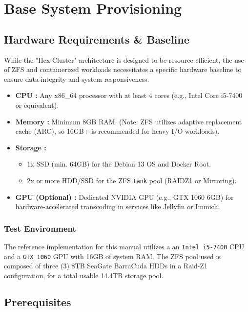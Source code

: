 \chapter{Base System Provisioning}\label{chap:base-provisioning}
\section{Hardware Requirements \& Baseline}
While the "Hex-Cluster" architecture is designed to be resource-efficient, the use of ZFS and containerized workloads necessitates a specific hardware baseline to ensure data-integrity and system responsiveness.

\begin{itemize}
	\item \textbf{CPU :} Any x86\_64 processor with at least 4 cores (e.g., Intel Core i5-7400 or equivalent).
	\item \textbf{Memory :} Minimum 8GB RAM. (Note: ZFS utilizes adaptive replacement cache (ARC), so 16GB+ is recommended for heavy I/O workloads).
	\item \textbf{Storage :} 
	\begin{itemize}
		\item 1x SSD (min. 64GB) for the Debian 13 OS and Docker Root.
		\item 2x or more HDD/SSD for the ZFS \texttt{tank} pool (RAIDZ1 or Mirroring).
	\end{itemize}
	\item \textbf{GPU (Optional) :} Dedicated NVIDIA GPU (e.g., GTX 1060 6GB) for hardware-accelerated transcoding in services like Jellyfin or Immich.
\end{itemize}

\subsection{Test Environment}
The reference implementation for this manual utilizes a an \texttt{Intel i5-7400} CPU and a \texttt{GTX 1060} GPU with 16\unit{GB} of system RAM. The ZFS pool used is composed of three (3) 8\unit{TB} SeaGate BarraCuda HDDs in a Raid-Z1 configuration, for a total usable 14.4\unit{TB} storage pool.

\section{Prerequisites}


